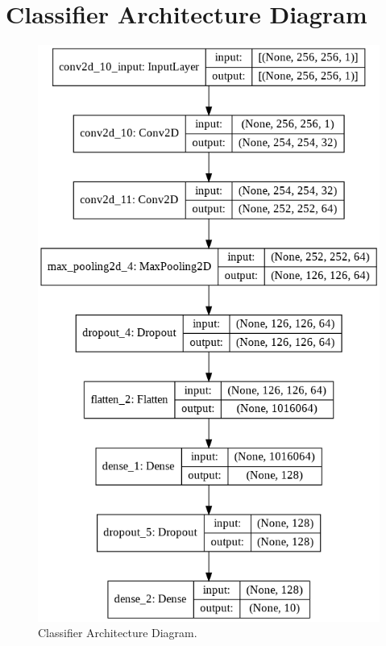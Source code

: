 \section{Classifier Architecture Diagram}
\begin{figure}[H]
        \vspace*{3cm}
	    \begin{center} 
	    \includegraphics[scale=0.45]{images/ClassifierArchitecture.png}
	     \caption{Classifier Architecture Diagram.}
	     \label{fig:ClassifierArchitecture}
	    \end{center}
\end{figure}


